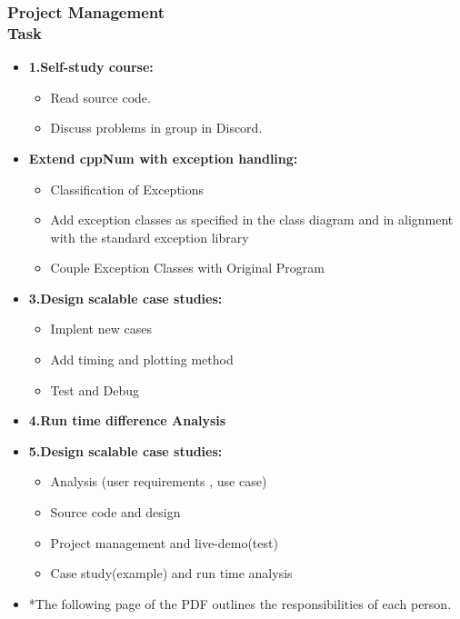 \documentclass[ucs,10pt]{beamer}
\begin{document}
\begin{frame}
\frametitle{Project Management \\
	\small \color{rwth-blue} Task}
	\begin{itemize}	
            \item \textbf{1.Self-study course:}
				\begin{itemize}
					\item Read source code.
					\item Discuss problems in group in Discord.
				\end{itemize}
			\item \textbf{Extend cppNum with exception handling:}
				\begin{itemize}
					\item Classification of Exceptions
					\item Add exception classes as specified in the class diagram and in alignment with the standard exception library
					\item Couple Exception Classes with Original Program
				\end{itemize}
			\item \textbf{3.Design scalable case studies:}
				\begin{itemize}
				\item Implent new cases
				\item Add timing and plotting method
				\item Test and Debug
				\end{itemize}
			\item \textbf{4.Run time difference Analysis}
			\item \textbf{5.Design scalable case studies:}
				\begin{itemize}
				\item Analysis (user requirements , use case)
				\item Source code and design
				\item Project management and live-demo(test)
				\item Case study(example) and run time analysis
				\end{itemize}
			\item *The following page of the PDF outlines the responsibilities of each person.
	\end{itemize}
\end{frame}
\end{document}
